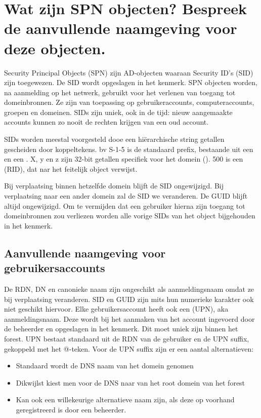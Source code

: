 \section{Wat zijn SPN objecten? Bespreek de aanvullende naamgeving voor deze
objecten.}

Security Principal Objects (SPN) zijn AD-objecten waaraan Security ID's (SID)
zijn toegewezen. De SID wordt opgeslagen in het  kenmerk.
SPN objecten worden, na aanmelding op het netwerk, gebruikt voor het verlenen
van toegang tot domeinbronnen. Ze zijn van toepassing op gebruikeraccounts,
computeraccounts, groepen en domeinen. SIDs zijn uniek, ook in de tijd: nieuw
aangemaakte accounts kunnen zo nooit de rechten krijgen van een oud account.

SIDs worden meestal voorgesteld dooe een hiërarchische string getallen
gescheiden door koppeltekens. bv  S-1-5 is de standaard
prefix, bestaande uit een  en een . X, y en z zijn 32-bit getallen specifiek voor het domein
(). 500 is een 
(RID), dat nar het feitelijk object verwijst.

Bij verplaatsing binnen hetzelfde domein blijft de SID ongewijzigd. Bij
verplaatsing naar een ander domein zal de SID we veranderen. De GUID blijft
altijd ongewijzigd. Om te vermijden dat een gebruiker hierna zijn toegang tot
domeinbronnen zou verliezen worden alle vorige SIDs van het object bijgehouden
in het  kenmerk.

\subsection{Aanvullende naamgeving voor gebruikersaccounts}

De RDN, DN en canonieke naam zijn ongeschikt als aanmeldingsnaam omdat ze bij
verplaatsing veranderen. SID en GUID zijn mits hun numerieke karakter ook niet
geschikt hiervoor. Elke gebruikersaccount heeft ook een  (UPN), aka aanmeldingsnaam. Deze wordt bij het aanmaken van het account
ingevoerd door de beheerder en opgeslagen in het 
kenmerk. Dit moet uniek zijn binnen het forest. UPN bestaat standaard uit de RDN
van de gebruiker en de UPN suffix, gekoppeld met het @-teken.
Voor de UPN suffix zijn er een aantal alternatieven:
\begin{itemize}
	\item Standaard wordt de DNS naam van het domein genomen
	\item Dikwijlst kiest men voor de DNS naar van het root domein van het
		forest
	\item Kan ook een willekeurige alternatieve naam zijn, als deze op
		voorhand geregistreerd is door een beheerder.
\end{itemize}

